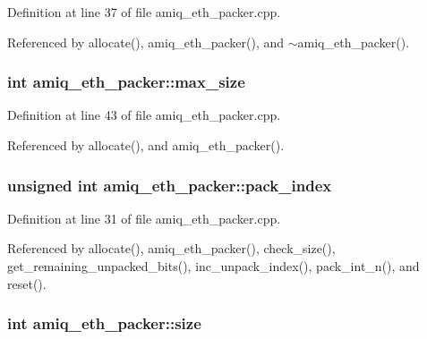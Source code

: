 Definition at line 37 of file amiq\_\-eth\_\-packer.cpp.

Referenced by allocate(), amiq\_\-eth\_\-packer(), and $\sim$amiq\_\-eth\_\-packer().\hypertarget{classamiq__eth__packer_a3fc5556f660d26c71d69f732c9ddb80f}{
\subsubsection[{max\_\-size}]{\setlength{\rightskip}{0pt plus 5cm}int {\bf amiq\_\-eth\_\-packer::max\_\-size}}}
\label{classamiq__eth__packer_a3fc5556f660d26c71d69f732c9ddb80f}


Definition at line 43 of file amiq\_\-eth\_\-packer.cpp.

Referenced by allocate(), and amiq\_\-eth\_\-packer().\hypertarget{classamiq__eth__packer_a02e2192acef20608462656554e21646b}{
\subsubsection[{pack\_\-index}]{\setlength{\rightskip}{0pt plus 5cm}unsigned int {\bf amiq\_\-eth\_\-packer::pack\_\-index}}}
\label{classamiq__eth__packer_a02e2192acef20608462656554e21646b}


Definition at line 31 of file amiq\_\-eth\_\-packer.cpp.

Referenced by allocate(), amiq\_\-eth\_\-packer(), check\_\-size(), get\_\-remaining\_\-unpacked\_\-bits(), inc\_\-unpack\_\-index(), pack\_\-int\_\-n(), and reset().\hypertarget{classamiq__eth__packer_a07f2906c680407d101afb9ac2c5d42f6}{
\subsubsection[{size}]{\setlength{\rightskip}{0pt plus 5cm}int {\bf amiq\_\-eth\_\-packer::size}}}
\label{classamiq__eth__packer_a07f2906c680407d101afb9ac2c5d42f6}


